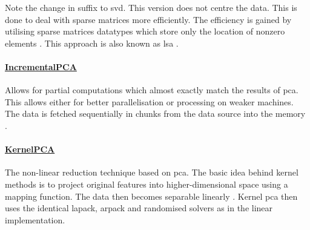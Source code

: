 Note the change in suffix to \gls{svd}.
This version does not centre the data.
This is done to deal with sparse matrices more efficiently.
The efficiency is gained by utilising sparse matrices datatypes which store only the location of nonzero elements \cite{HandsOnMLCh1}.
This approach is also known as \gls{lsa} \cite{scikit-learn}.


\paragraph{\href{https://scikit-learn.org/stable/modules/generated/sklearn.decomposition.IncrementalPCA.html\#sklearn.decomposition.IncrementalPCA}{%
%
IncrementalPCA%
}}

Allows for partial computations which almost exactly match the results of \gls{pca}.
This allows either for better parallelisation or processing on weaker machines.
The data is fetched sequentially in chunks from the data source into the memory \cite{scikit-learn}.


\paragraph{\href{https://scikit-learn.org/stable/modules/generated/sklearn.decomposition.KernelPCA.html\#sklearn.decomposition.KernelPCA}{%
%
KernelPCA%
}}

The non-linear reduction technique based on \gls{pca}.
The basic idea behind kernel methods is to project original features into higher-dimensional space using a mapping function.
The data then becomes separable linearly \cite{PythonMachineLearningCh1}.
Kernel \gls{pca} then uses the identical \acrshort{lapack}, \acrshort{arpack} and randomised solvers as in the linear implementation.


\clearpage
